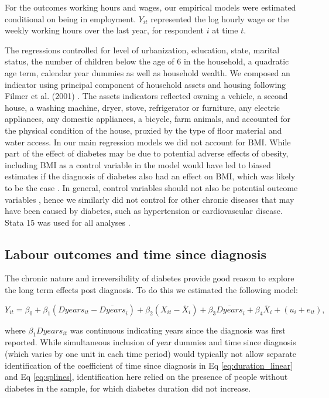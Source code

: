 \documentclass[10pt,letterpaper]{article}
\begin{document}
For the outcomes  working hours and wages, our empirical models were estimated conditional on being in employment. $Y_{it}$ represented the log hourly wage or the weekly working hours over the last year, for respondent $i$ at time $t$.

The regressions controlled for level of urbanization, education, state, marital status, the number of children below the age of 6  in the household, a quadratic age term, calendar year dummies as well as household wealth. We composed an indicator using principal component of household assets and housing following Filmer et al. (2001) \cite{Filmer2001}. The assets indicators reflected owning a vehicle, a second house, a washing machine, dryer, stove, refrigerator or furniture, any electric appliances, any domestic appliances, a bicycle, farm animals, and accounted for the physical condition of the house, proxied by the type of floor material and water access. In our main regression models we did not account for \ac{BMI}. While part of the effect of diabetes may be due to potential adverse effects of obesity, including \ac{BMI} as a control variable in the model would have led to biased estimates if the diagnosis of diabetes also had an effect on \ac{BMI}, which was likely to be the case \cite{Slade2012,DeFineOlivarius2015}. In general, control variables should not also be potential outcome variables \cite{Angrist2009a}, hence we similarly did not control for other chronic diseases that may have been caused by diabetes, such as hypertension or cardiovascular disease. Stata 15 was used for all analyses \cite{StataCorp2017}.



\subsection*{Labour outcomes and time since diagnosis}

The chronic nature and irreversibility of diabetes provide good reason to explore the long term effects post diagnosis.  To do this we estimated the following model:

\begin{equation}
Y_{it}=\beta_{0}+\beta_{1}(Dyears_{it}-\overline{Dyears}_{i})+\beta_{2}(X_{it}-\overline{X}_i)+\beta_{3}\overline{Dyears}_{i}+\beta_{4}\overline{X}_i+(u_{i}+e_{it}),\label{eq:duration_linear}
\end{equation}

where $\beta_{1}Dyears_{it}$ was continuous indicating years since the diagnosis was first reported. While simultaneous inclusion of year dummies and time since diagnosis (which varies by one unit in each time period) would typically not allow separate identification of the coefficient of time since diagnosis in Eq \ref{eq:duration_linear} and Eq  \ref{eq:splines}, identification here relied on the presence of people without diabetes in the sample, for which diabetes duration did not increase.
\end{document}
